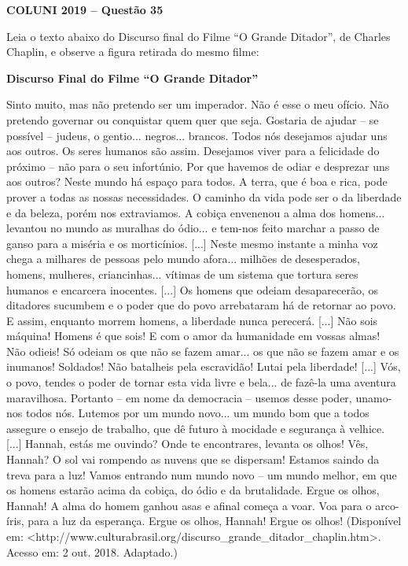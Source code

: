 \textbf{COLUNI 2019 -- Questão 35}\par\medskip Leia o texto abaixo do Discurso final do Filme “O Grande Ditador”, de Charles Chaplin, e observe a figura retirada do mesmo filme:

\par

\textbf{Discurso Final do Filme “O Grande Ditador”}

\par

Sinto muito, mas não pretendo ser um imperador. Não é esse o meu ofício. Não pretendo governar ou conquistar quem quer que seja. Gostaria de ajudar – se possível – judeus, o gentio... negros... brancos. Todos nós desejamos ajudar uns aos outros. Os seres humanos são assim. Desejamos viver para a felicidade do próximo – não para o seu infortúnio. Por que havemos de odiar e desprezar uns aos outros? Neste mundo há espaço para todos. A terra, que é boa e rica, pode prover a todas as nossas necessidades. O caminho da vida pode ser o da liberdade e da beleza, porém nos extraviamos. A cobiça envenenou a alma dos homens... levantou no mundo as muralhas do ódio... e tem-nos feito marchar a passo de ganso para a miséria e os morticínios. [...] Neste mesmo instante a minha voz chega a milhares de pessoas pelo mundo afora... milhões de desesperados, homens, mulheres, criancinhas... vítimas de um sistema que tortura seres humanos e encarcera inocentes. [...] Os homens que odeiam desaparecerão, os ditadores sucumbem e o poder que do povo arrebataram há de retornar ao povo. E assim, enquanto morrem homens, a liberdade nunca perecerá. [...] Não sois máquina! Homens é que sois! E com o amor da humanidade em vossas almas! Não odieis! Só odeiam os que não se fazem amar... os que não se fazem amar e os inumanos! Soldados! Não batalheis pela escravidão! Lutai pela liberdade! [...] Vós, o povo, tendes o poder de tornar esta vida livre e bela... de fazê-la uma aventura maravilhosa. Portanto – em nome da democracia – usemos desse poder, unamo-nos todos nós. Lutemos por um mundo novo... um mundo bom que a todos assegure o ensejo de trabalho, que dê futuro à mocidade e segurança à velhice. [...] Hannah, estás me ouvindo? Onde te encontrares, levanta os olhos! Vês, Hannah? O sol vai rompendo as nuvens que se dispersam! Estamos saindo da treva para a luz! Vamos entrando num mundo novo – um mundo melhor, em que os homens estarão acima da cobiça, do ódio e da brutalidade. Ergue os olhos, Hannah! A alma do homem ganhou asas e afinal começa a voar. Voa para o arco-íris, para a luz da esperança. Ergue os olhos, Hannah! Ergue os olhos! (Disponível em: <http://www.culturabrasil.org/discurso\_grande\_ditador\_chaplin.htm>. Acesso em: 2 out. 2018. Adaptado.)


